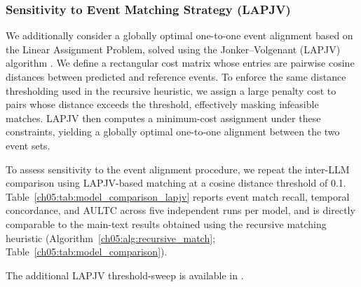 

\subsubsection{Sensitivity to Event Matching Strategy (LAPJV)}
\label{ch05:apd:lapjv-matching}
We additionally consider a globally optimal one-to-one event alignment based on the Linear Assignment Problem, solved using the Jonker--Volgenant (LAPJV) algorithm \citep{jonker1987shortest}.
We define a rectangular cost matrix whose entries are pairwise cosine distances between predicted and reference events.
To enforce the same distance thresholding used in the recursive heuristic, we assign a large penalty cost to pairs whose distance exceeds the threshold, effectively masking infeasible matches.
LAPJV then computes a minimum-cost assignment under these constraints, yielding a globally optimal one-to-one alignment between the two event sets.

To assess sensitivity to the event alignment procedure, we repeat the inter-LLM comparison using LAPJV-based matching at a cosine distance threshold of 0.1.
Table~\ref{ch05:tab:model_comparison_lapjv} reports event match recall, temporal concordance, and AULTC across five independent runs per model, and is directly comparable to the main-text results obtained using the recursive matching heuristic (Algorithm~\ref{ch05:alg:recursive_match}; Table~\ref{ch05:tab:model_comparison}).



The additional LAPJV threshold-sweep is available in \citep[Sensitivity Analyses: Sensitivity to Event Matching Strategy (LAPJV)]{noroozizadeh-pmoa-tts-v4}.
